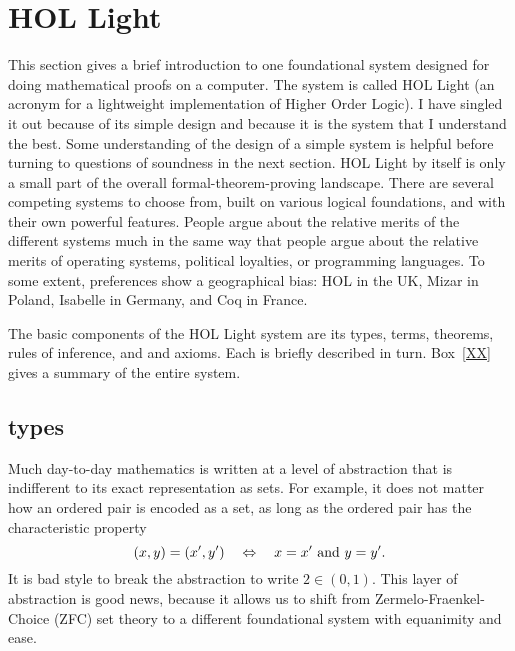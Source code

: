 \documentclass{llncs}
\begin{document}
\section{HOL Light}

This section gives a brief introduction to one foundational
system designed for doing mathematical proofs on a computer.
The system is called HOL Light
(an acronym for a lightweight implementation of Higher Order Logic).
I have singled it out because of its simple design and because it is
the system that I understand the best.
Some understanding of the design of a simple system is helpful before
turning to questions of soundness in the next section.
HOL Light by itself is only a small part of the overall formal-theorem-proving
landscape.
  There are several competing systems to choose from, %
built on various logical foundations, and
 with their own powerful features.
People argue about the relative merits of the
different systems much in the same way that people argue about the relative merits
of operating systems, political loyalties, or programming languages.  To some extent, preferences
show a geographical bias:  HOL in the UK, Mizar in Poland, Isabelle in Germany, and
Coq in France.





The basic components of the HOL Light system are its types, terms, theorems,
rules of inference, and
and axioms.  Each is briefly described in turn.  Box~\ref{XX} gives a summary
of the entire system.  

\subsection{types}

Much day-to-day mathematics is written at a level of abstraction that is
indifferent to its exact representation  as sets.  For example, 
it does not matter how an ordered pair is encoded as a 
set, as long as the ordered pair has the characteristic property
 $$
 (x,y) = (x',y') \quad \Leftrightarrow\quad  x = x' \hbox{ and } y=y'.
 $$
It is bad style to break the abstraction to write $2\in(0,1)$.
This layer of abstraction is good news, because it allows us to shift
from Zermelo-Fraenkel-Choice (ZFC) set theory  to a different foundational system with equanimity and ease.  
\end{document}
